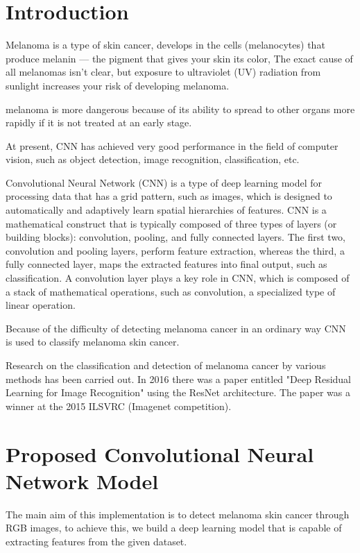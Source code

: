 \section{Introduction}
    Melanoma is a type of skin cancer, develops in the cells (melanocytes) that produce melanin — the pigment that gives your skin its color, The exact cause of all melanomas isn't clear, but exposure to ultraviolet (UV) radiation from sunlight increases your risk of developing melanoma. ~\cite{mayo2022}

    melanoma is more dangerous because of its ability to spread to other organs more rapidly if it is not treated at an early stage. ~\cite{scfm2022}

    At present, CNN has achieved very good performance in the field of computer vision, such as object detection, image recognition, classification, etc. 

    Convolutional Neural Network (CNN) is a type of deep learning model for processing data that has a grid pattern, such as images, which is designed to automatically and adaptively learn spatial hierarchies of features. CNN is a mathematical construct that is typically composed of three types of layers (or building blocks): convolution, pooling, and fully connected layers. The first two, convolution and pooling layers, perform feature extraction, whereas the third, a fully connected layer, maps the extracted features into final output, such as classification. A convolution layer plays a key role in CNN, which is composed of a stack of mathematical operations, such as convolution, a specialized type of linear operation. \cite{Yamashita2018}

    Because of the difficulty of detecting melanoma cancer in an ordinary way CNN is used to classify melanoma skin cancer.

    Research on the classification and detection of melanoma cancer by various methods has been carried out. In 2016 there was a paper entitled "Deep Residual Learning for Image Recognition" using the ResNet architecture. The paper was a winner at the 2015 ILSVRC (Imagenet competition). ~\cite{Arief2019}


\section{Proposed Convolutional Neural Network Model}
    The main aim of this implementation is to detect melanoma skin cancer through RGB images, to achieve this, we build a deep learning model that is capable of extracting features from the given dataset.

